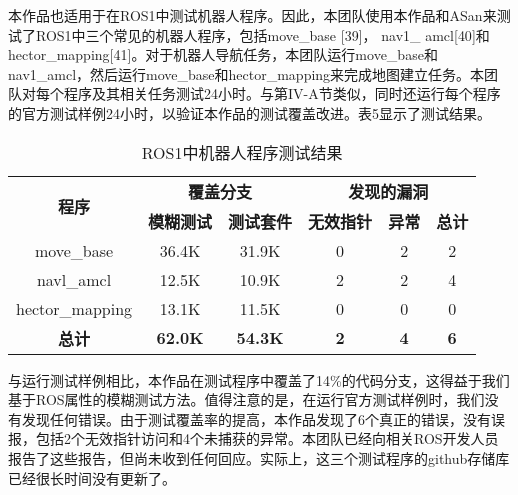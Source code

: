 本作品也适用于在ROS1中测试机器人程序。因此，本团队使用本作品和ASan来测试了ROS1中三个常见的机器人程序，包括move\_base
{[}39{]}， nav1\_
amcl{[}40{]}和hector\_mapping{[}41{]}。对于机器人导航任务，本团队运行move\_base和nav1\_amcl，然后运行move\_base和hector\_mapping来完成地图建立任务。本团队对每个程序及其相关任务测试24小时。与第IV-A节类似，同时还运行每个程序的官方测试样例24小时，以验证本作品的测试覆盖改进。表5显示了测试结果。
\begin{table}[H]
	\small
	\caption{ROS1中机器人程序测试结果}
	\centering
	\begin{tabular}{cccccc}
		\hline
		\multirow{2}{*}{\textbf{程序}} & \multicolumn{2}{c}{\textbf{覆盖分支}} & \multicolumn{3}{c}{\textbf{发现的漏洞}} \\
		\cline{2-6}
		& \textbf{模糊测试} & \textbf{测试套件} & \textbf{无效指针} & \textbf{异常} & \textbf{总计} \\
		\hline
		move\_base & 36.4K & 31.9K & 0 & 2 & 2 \\
		navl\_amcl & 12.5K & 10.9K & 2 & 2 & 4 \\
		hector\_mapping & 13.1K & 11.5K & 0 & 0 & 0 \\
		\textbf{总计} & \textbf{62.0K} & \textbf{54.3K} & \textbf{2} & \textbf{4} & \textbf{6} \\
		\hline
	\end{tabular}
\end{table}

与运行测试样例相比，本作品在测试程序中覆盖了14\%的代码分支，这得益于我们基于ROS属性的模糊测试方法。值得注意的是，在运行官方测试样例时，我们没有发现任何错误。由于测试覆盖率的提高，本作品发现了6个真正的错误，没有误报，包括2个无效指针访问和4个未捕获的异常。本团队已经向相关ROS开发人员报告了这些报告，但尚未收到任何回应。实际上，这三个测试程序的github存储库已经很长时间没有更新了。